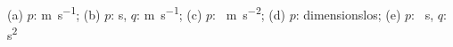(a) $p$: \si{\meter\per\second}; (b) $p$: \si{\second}, $q$: \si{\meter\per\second}; (c) $p$: \si{\per\meter\per\second\squared}; (d) $p$: dimensionslos; (e) $p$: \si{\per\second}, $q$: \si{\second\squared}
